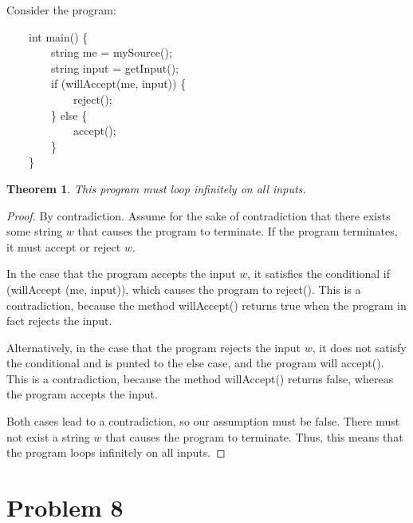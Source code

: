 \documentclass[10pt,letter]{article}
\newtheorem*{thm}{Theorem}
\begin{document}
Consider the program:
{\selectfont

$\qquad$int main() \{\\
$\qquad$$\qquad$string me = mySource();\\
$\qquad$$\qquad$string input = getInput();\\
$\qquad$$\qquad$if (willAccept(me, input)) \{\\
$\qquad$$\qquad$$\qquad$reject();\\
$\qquad$$\qquad$\} else \{\\
$\qquad$$\qquad$$\qquad$accept();\\
$\qquad$$\qquad$\}\\
$\qquad$\}
}
\begin{thm}This program must loop infinitely on all inputs.\end{thm}
\begin{proof}
By contradiction. Assume for the sake of contradiction that there exists some string $w$ that causes the program to terminate. If the program terminates, it must accept or reject $w$. 

In the case that the program accepts the input $w$, it satisfies the conditional {\selectfont if (willAccept (me, input))}, which causes the program to {\selectfont reject()}. This is a contradiction, because the method {\selectfont willAccept()} returns true when the program in fact rejects the input.

Alternatively, in the case that the program rejects the input $w$, it does not satisfy the conditional and is punted to the {\selectfont else} case, and the program will {\selectfont accept()}. This is a contradiction, because the method {\selectfont willAccept()} returns false, whereas the program accepts the input.

Both cases lead to a contradiction, so our assumption must be false. There must not exist a string $w$ that causes the program to terminate. Thus, this means that the program loops infinitely on all inputs. 
\end{proof}
\section*{Problem 8}
\end{document}
